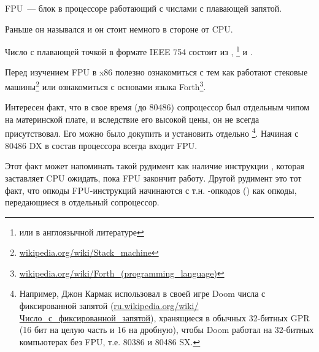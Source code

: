 \chapterold{\FPUChapterName}
\label{sec:FPU}

\newcommand{\FNURLSTACK}{\footnote{\href{http://go.yurichev.com/17123}{wikipedia.org/wiki/Stack\_machine}}}
\newcommand{\FNURLFORTH}{\footnote{\href{http://go.yurichev.com/17124}{wikipedia.org/wiki/Forth\_(programming\_language)}}}
\newcommand{\FNURLIEEE}{\footnote{\href{http://go.yurichev.com/17125}{wikipedia.org/wiki/IEEE\_floating\_point}}}
\newcommand{\FNURLSP}{\footnote{\href{http://go.yurichev.com/17126}{wikipedia.org/wiki/Single-precision\_floating-point\_format}}}
\newcommand{\FNURLDP}{\footnote{\href{http://go.yurichev.com/17127}{wikipedia.org/wiki/Double-precision\_floating-point\_format}}}
\newcommand{\FNURLEP}{\footnote{\href{http://go.yurichev.com/17128}{wikipedia.org/wiki/Extended\_precision}}}

\ac{FPU}~--- блок в процессоре работающий с числами с плавающей запятой.

Раньше он назывался  и он стоит немного в стороне от \ac{CPU}.


Число с плавающей точкой в формате IEEE 754 состоит из , \footnote{ или  
в англоязычной литературе} и .


Перед изучением \ac{FPU} в x86 полезно ознакомиться с тем как работают стековые машины\FNURLSTACK 
или ознакомиться с основами языка Forth\FNURLFORTH.

Интересен факт, что в свое время (до 80486) сопроцессор был отдельным чипом на материнской плате, 
и вследствие его высокой цены, он не всегда присутствовал. Его можно было докупить и установить отдельно
\footnote{Например, Джон Кармак использовал в своей игре Doom числа с фиксированной запятой 
(\href{http://go.yurichev.com/17357}{ru.wikipedia.org/wiki/Число\_с\_фиксированной\_запятой}), хранящиеся
в обычных 32-битных \ac{GPR} (16 бит на целую часть и 16 на дробную),
чтобы Doom работал на 32-битных компьютерах без FPU, т.е. 80386 и 80486 SX.}.
Начиная с 80486 DX в состав процессора всегда входит FPU.

Этот факт может напоминать такой рудимент как наличие инструкции , которая заставляет
\ac{CPU} ожидать, пока \ac{FPU} закончит работу.
Другой рудимент это тот факт, что опкоды \ac{FPU}-инструкций начинаются с т.н. -опкодов 
() как опкоды, передающиеся в отдельный сопроцессор.

